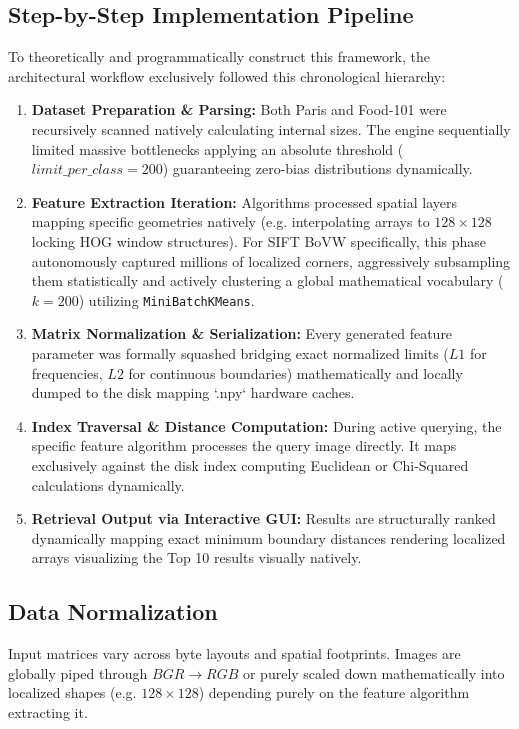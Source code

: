 \documentclass[11pt, a4paper]{article}
\begin{document}
\subsection{Step-by-Step Implementation Pipeline}
To theoretically and programmatically construct this framework, the architectural workflow exclusively followed this chronological hierarchy:
\begin{enumerate}
    \item \textbf{Dataset Preparation \& Parsing:} Both Paris and Food-101 were recursively scanned natively calculating internal sizes. The engine sequentially limited massive bottlenecks applying an absolute threshold ($limit\_per\_class=200$) guaranteeing zero-bias distributions dynamically.
    \item \textbf{Feature Extraction Iteration:} Algorithms processed spatial layers mapping specific geometries natively (e.g. interpolating arrays to $128 \times 128$ locking HOG window structures). For SIFT BoVW specifically, this phase autonomously captured millions of localized corners, aggressively subsampling them statistically and actively clustering a global mathematical vocabulary ($k=200$) utilizing \texttt{MiniBatchKMeans}.
    \item \textbf{Matrix Normalization \& Serialization:} Every generated feature parameter was formally squashed bridging exact normalized limits ($L1$ for frequencies, $L2$ for continuous boundaries) mathematically and locally dumped to the disk mapping `.npy` hardware caches.
    \item \textbf{Index Traversal \& Distance Computation:} During active querying, the specific feature algorithm processes the query image directly. It maps exclusively against the disk index computing Euclidean or Chi-Squared calculations dynamically.
    \item \textbf{Retrieval Output via Interactive GUI:} Results are structurally ranked dynamically mapping exact minimum boundary distances rendering localized arrays visualizing the Top 10 results visually natively.
\end{enumerate}

\subsection{Data Normalization}
Input matrices vary across byte layouts and spatial footprints. Images are globally piped through $BGR \rightarrow RGB$ or purely scaled down mathematically into localized shapes (e.g. $128 \times 128$) depending purely on the feature algorithm extracting it.
\end{document}
